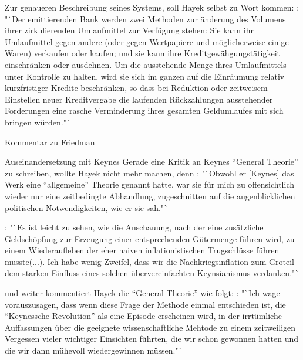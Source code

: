 \documentclass[
    onecolumn,
    a4paper,
    abstracton,
    parskip=half
    ,final
    ]{scrartcl}
\begin{document}
Zur genaueren Beschreibung seines Systems, soll Hayek selbst zu Wort kommen: \citep[vgl.][S.45]{Hayek1977}: "`Der emittierenden Bank werden zwei Methoden zur {\"a}nderung des Volumens ihrer zirkulierenden Umlaufmittel zur Verf{\"u}gung stehen: Sie kann ihr Umlaufmittel gegen andere (oder gegen Wertpapiere und m{\"o}glicherweise einige Waren) verkaufen oder kaufen; und sie kann ihre Kreditgew{\"a}hgungst{\"a}tigkeit einschr{\"a}nken oder ausdehnen. Um die ausstehende Menge ihres Umlaufmittels unter Kontrolle zu halten, wird sie sich im ganzen auf die Einr{\"a}umung relativ kurzfristiger Kredite beschr{\"a}nken, so dass bei Reduktion oder zeitweisem Einstellen neuer Kreditvergabe die laufenden R{\"u}ckzahlungen ausstehender Forderungen eine rasche Verminderung ihres gesamten Geldumlaufes mit sich bringen w{\"u}rden."`


Kommentar zu Friedman

Auseinandersetzung mit Keynes
Gerade eine Kritik an Keynes "`General Theorie"'  zu schreiben, wollte Hayek nicht mehr machen, denn \citep[vgl.][S.91]{Hayek1969}: "`Obwohl er [Keynes] das Werk eine "`allgemeine"' Theorie genannt hatte, war sie f{\"u}r mich zu offensichtlich wieder nur eine zeitbedingte Abhandlung, zugeschnitten auf die augenblicklichen politischen Notwendigkeiten, wie er sie sah."`

\citep[vgl.][S.93]{Hayek1969}: "`Es ist leicht zu sehen, wie die Anschauung, nach der eine zus{\"a}tzliche Geldsch{\"o}pfung zur Erzeugung einer entsprechenden G{\"u}termenge f{\"u}hren wird, zu einem Wiederaufleben der eher naiven inflationistischen Trugschl{\"u}sse f{\"u}hren musste(...). Ich habe wenig Zweifel, dass wir die Nachkriegsinflation zum Gro{\s}teil dem starken Einfluss eines solchen {\"u}bervereinfachten Keynsianismus verdanken."`

und weiter kommentiert Hayek die "`General Theorie"' wie folgt:
\citep[vgl.][S.96]{Hayek1969}: "`Ich wage vorauszusagen, dass wenn diese Frage der Methode einmal entschieden ist, die "`Keynessche Revolution"' als eine Episode erscheinen wird, in der irrt{\"u}mliche Auffassungen {\"u}ber die geeignete wissenschaftliche Mehtode zu einem zeitweiligen Vergessen vieler wichtiger Einsichten f{\"u}hrten, die wir schon gewonnen hatten und die wir dann m{\"u}hevoll wiedergewinnen m{\"u}ssen."`
\end{document}
